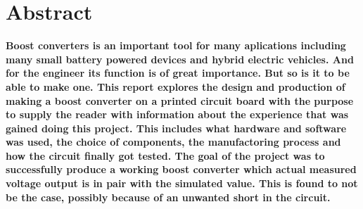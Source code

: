 \section{Abstract}
\textbf{Boost converters is an important tool for many aplications including many small battery powered devices and hybrid electric vehicles. And for the engineer its function is of great importance. But so is it to be able to make one. This report explores the design and production of making a boost converter on a printed circuit board with the purpose to supply the reader with information about the experience that was gained doing this project. This includes what hardware and software was used, the choice of components, the manufactoring process and how the circuit finally got tested. The goal of the project was to successfully produce a working boost converter which actual measured voltage output is in pair with the simulated value. This is found to not be the case, possibly because of an unwanted short in the circuit.}

